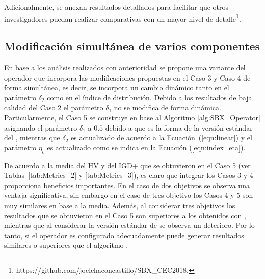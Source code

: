 %
%
%
Adicionalmente, se anexan resultados detallados para facilitar que otros investigadores puedan realizar comparativas con un mayor
nivel de detalle\footnote{https:\//\//github.com\//joelchaconcastillo\//SBX\_CEC2018.}.


\subsection{Modificación simultánea de varios componentes}

En base a los análisis realizados con anterioridad se propone una variante del operador \SBX{} que incorpora las modificaciones propuestas
en el Caso 3 y Caso 4 de forma simultánea, es decir, se incorpora un cambio dinámico tanto en el parámetro $\delta_2$ como en el índice de distribución.
%
Debido a los resultados de baja calidad del Caso 2 el parámetro $\delta_1$ no se modifica de forma dinámica.
%
Particularmente, el Caso 5 se construye en base al Algoritmo \ref{alg:SBX_Operator} asignando el parámetro $\delta_1$ a $0.5$ debido
a que es la forma de la versión estándar del \SBX{}, mientras que $\delta_2$ es actualizado de acuerdo a la Ecuación~(\ref{eqn:linear}) y
el parámetro $\eta_c$ es actualizado como se indica en la Ecuación (\ref{eqn:index_eta}).

De acuerdo a la media del HV y del IGD+ que se obtuvieron en el Caso 5 (ver Tablas~\ref{tab:Metrics_2} y \ref{tab:Metrics_3}), es claro que integrar los 
Casos 3 y 4 proporciona beneficios importantes.
%
En el caso de dos objetivos se observa una ventaja significativa, sin embargo en el caso de tres objetivo los Casos 4 y 5 son muy similares en base a la media.
%
Además, al considerar tres objetivos los resultados que se obtuvieron en el Caso 5 son superiores a los obtenidos con \DE{}, 
mientras que al considerar la versión estándar de \SBX{} se observa un deterioro.
%
Por lo tanto, si el operador \SBX{} es configurado adecuadamente puede generar resultados similares o superiores que el algoritmo \DEMO{}. 

